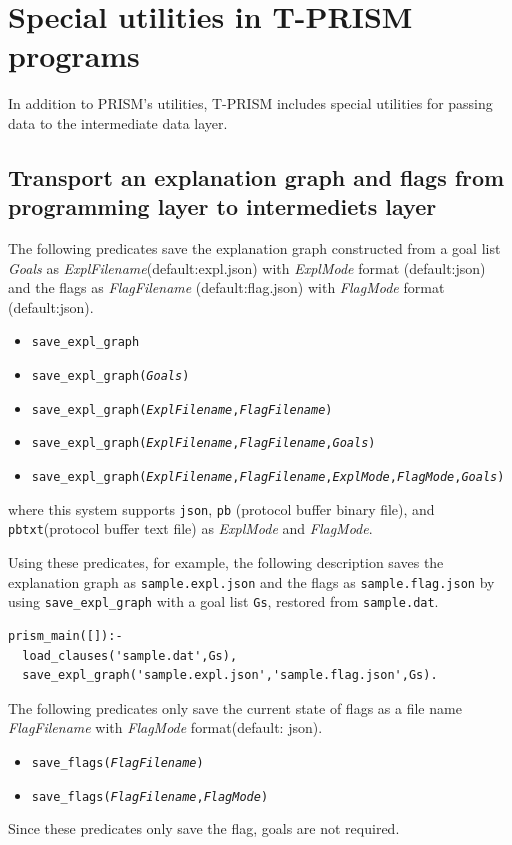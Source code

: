 \documentclass[a4paper]{report}
\begin{document}
\section{Special utilities in T-PRISM programs}
\label{sec:tprism_predicate}

In addition to PRISM's utilities, T-PRISM includes special utilities for passing data to the intermediate data layer.

\subsection*{Transport an explanation graph and flags from programming layer to intermediets layer}

The following predicates save the explanation graph constructed from a goal list {\it Goals}
as {\it ExplFilename}(default:expl.json) with {\it ExplMode} format (default:json) and the flags as {\it FlagFilename} (default:flag.json) with {\it FlagMode} format (default:json).
\begin{itemize}
	\item {\tt save\_expl\_graph}
	\item {\tt save\_expl\_graph({\it Goals})}
	\item {\tt save\_expl\_graph({\it ExplFilename},{\it FlagFilename})}
	\item {\tt save\_expl\_graph({\it ExplFilename},{\it FlagFilename},{\it Goals})}
	\item {\tt save\_expl\_graph({\it ExplFilename},{\it FlagFilename},{\it ExplMode},{\it FlagMode},{\it Goals})}
\end{itemize}
where this system supports {\tt json}, {\tt pb} (protocol buffer binary file), and {\tt pbtxt}(protocol buffer text file) as {\it ExplMode} and {\it FlagMode}.

Using these predicates, for example, the following description saves the explanation graph as {\tt sample.expl.json} and the flags as {\tt sample.flag.json}
by using {\tt save\_expl\_graph} with a goal list {\tt Gs}, restored from  {\tt sample.dat}.
\begin{verbatim}
prism_main([]):-
  load_clauses('sample.dat',Gs),
  save_expl_graph('sample.expl.json','sample.flag.json',Gs).
\end{verbatim}


The following predicates only save the current state of flags as a file name {\it FlagFilename} with {\it FlagMode} format(default: json).
\begin{itemize}
	\item {\tt save\_flags({\it FlagFilename})}
	\item {\tt save\_flags({\it FlagFilename},{\it FlagMode})}
\end{itemize}
Since these predicates only save the flag, goals are not required.
\end{document}
